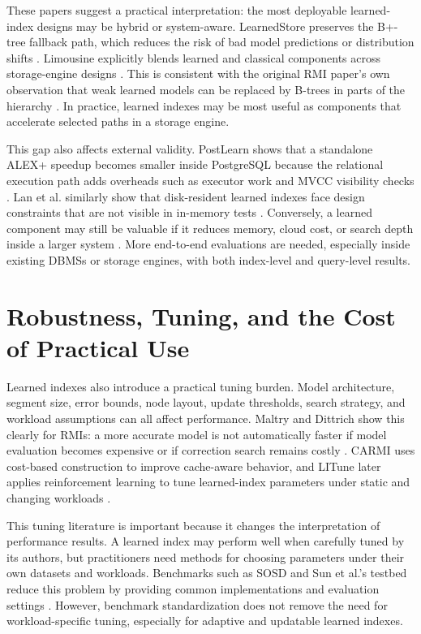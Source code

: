 \documentclass[a4paper, 12pt, twoside]{report}
\begin{document}
These papers suggest a practical interpretation: the most deployable learned-index designs may be hybrid or system-aware. LearnedStore preserves the B+-tree fallback path, which reduces the risk of bad model predictions or distribution shifts \cite{maharjan2023learnedstore}. Limousine explicitly blends learned and classical components across storage-engine designs \cite{chatterjee2024limousine}. This is consistent with the original RMI paper's own observation that weak learned models can be replaced by B-trees in parts of the hierarchy \cite{kraska2018}. In practice, learned indexes may be most useful as components that accelerate selected paths in a storage engine.

This gap also affects external validity. PostLearn shows that a standalone ALEX+ speedup becomes smaller inside PostgreSQL because the relational execution path adds overheads such as executor work and MVCC visibility checks \cite{fuad2026postlearn}. Lan et al. similarly show that disk-resident learned indexes face design constraints that are not visible in in-memory tests \cite{lan2023disk}. Conversely, a learned component may still be valuable if it reduces memory, cloud cost, or search depth inside a larger system \cite{chatterjee2024limousine}. More end-to-end evaluations are needed, especially inside existing DBMSs or storage engines, with both index-level and query-level results.

\section{Robustness, Tuning, and the Cost of Practical Use}

Learned indexes also introduce a practical tuning burden. Model architecture, segment size, error bounds, node layout, update thresholds, search strategy, and workload assumptions can all affect performance. Maltry and Dittrich show this clearly for RMIs: a more accurate model is not automatically faster if model evaluation becomes expensive or if correction search remains costly \cite{maltry2022critical}. CARMI uses cost-based construction to improve cache-aware behavior, and LITune later applies reinforcement learning to tune learned-index parameters under static and changing workloads \cite{zhang2022carmi,wang2025tuning}.

This tuning literature is important because it changes the interpretation of performance results. A learned index may perform well when carefully tuned by its authors, but practitioners need methods for choosing parameters under their own datasets and workloads. Benchmarks such as SOSD and Sun et al.'s testbed reduce this problem by providing common implementations and evaluation settings \cite{marcus2020benchmarking,sun2023learned}. However, benchmark standardization does not remove the need for workload-specific tuning, especially for adaptive and updatable learned indexes.
\end{document}
